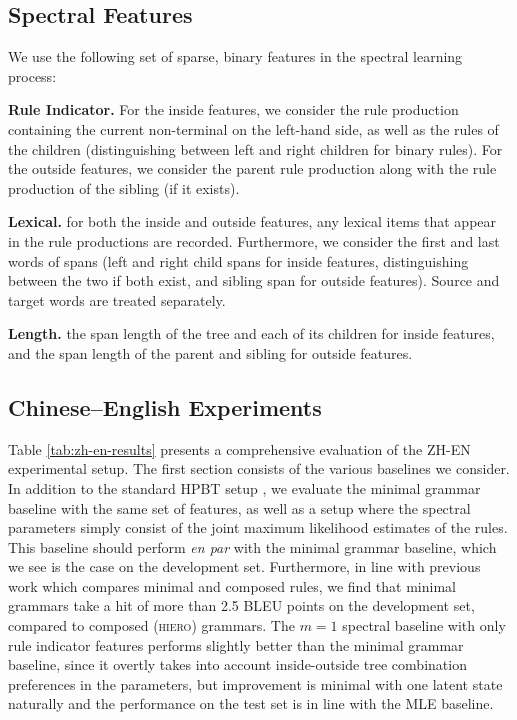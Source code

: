 \documentclass[11pt]{article}
\newenvironment{itemizesquish}{\begin{list}{\setcounter{enumi}{0}\labelitemi}{\setlength{\itemsep}{-0.25em}\setlength{\labelwidth}{0.5em}\setlength{\leftmargin}{\labelwidth}\addtolength{\leftmargin}{\labelsep}}}{\end{list}}
\begin{document}
\subsection{Spectral Features}
\label{sec:features}
We use the following set of sparse, binary features in the spectral learning process:
\begin{itemizesquish}
	\item \textbf{Rule Indicator.} For the inside features, we consider the rule production containing the current non-terminal on the left-hand side, as well as the rules of the children (distinguishing between left and right children for binary rules).  
	For the outside features, we consider the parent rule production along with the rule production of the sibling (if it exists). 
	\item \textbf{Lexical.} for both the inside and outside features, any lexical items that appear in the rule productions are recorded.  
	Furthermore, we consider the first and last words of spans (left and right child spans for inside features, distinguishing between the two if both exist, and sibling span for outside features).  
	Source and target words are treated separately. 
	\item \textbf{Length.} the span length of the tree and each of its children for inside features, and the span length of the parent and sibling for outside features. 	
\end{itemizesquish}

\subsection{Chinese--English Experiments}
Table \ref{tab:zh-en-results} presents a comprehensive evaluation of the \textsc{ZH-EN} experimental setup.  
The first section consists of the various baselines we consider. 
In addition to the standard HPBT setup \cite{Chiang2007}, we evaluate the minimal grammar baseline with the same set of features, as well as a setup where the spectral parameters simply consist of the joint maximum likelihood estimates of the rules.  
This baseline should perform \emph{en par} with the minimal grammar baseline, which we see is the case on the development set.  
Furthermore, in line with previous work \cite{Galley2006} which compares minimal and composed rules, we find that minimal grammars take a hit of more than 2.5 BLEU points on the development set, compared to composed (\textsc{hiero}) grammars.  
The $m=1$ spectral baseline with only rule indicator features performs slightly better than the minimal grammar baseline, since it overtly takes into account inside-outside tree combination preferences in the parameters, but improvement is minimal with one latent state naturally and the performance on the test set is in line with the MLE baseline.  
\end{document}

